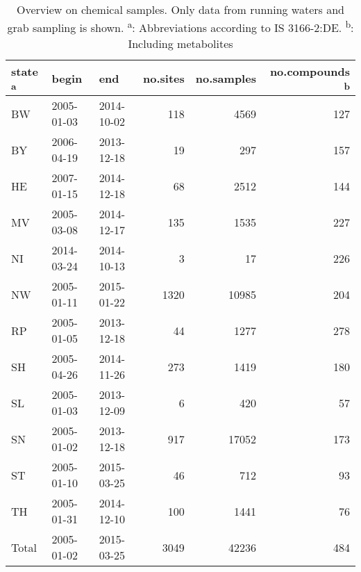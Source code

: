 \begin{table}[ht]
\centering
\caption{Overview on chemical samples. Only data from running waters and grab
sampling is shown. \textsuperscript{a}: Abbreviations according to IS 3166-2:DE. 
      \textsuperscript{b}: Including metabolites} 
\label{tab:phch_overview}
\begin{tabular}{lllrrr}
  \toprule
state \textsuperscript{a} & begin & end & no.sites & no.samples & no.compounds \textsuperscript{b} \\ 
  \midrule
BW & 2005-01-03 & 2014-10-02 & 118 & 4569 & 127 \\ 
  BY & 2006-04-19 & 2013-12-18 & 19 & 297 & 157 \\ 
  HE & 2007-01-15 & 2014-12-18 & 68 & 2512 & 144 \\ 
  MV & 2005-03-08 & 2014-12-17 & 135 & 1535 & 227 \\ 
  NI & 2014-03-24 & 2014-10-13 & 3 & 17 & 226 \\ 
  NW & 2005-01-11 & 2015-01-22 & 1320 & 10985 & 204 \\ 
  RP & 2005-01-05 & 2013-12-18 & 44 & 1277 & 278 \\ 
  SH & 2005-04-26 & 2014-11-26 & 273 & 1419 & 180 \\ 
  SL & 2005-01-03 & 2013-12-09 & 6 & 420 & 57 \\ 
  SN & 2005-01-02 & 2013-12-18 & 917 & 17052 & 173 \\ 
  ST & 2005-01-10 & 2015-03-25 & 46 & 712 & 93 \\ 
  TH & 2005-01-31 & 2014-12-10 & 100 & 1441 & 76 \\ 
   \midrule
Total & 2005-01-02 & 2015-03-25 & 3049 & 42236 & 484 \\ 
   \bottomrule
\end{tabular}
\end{table}
